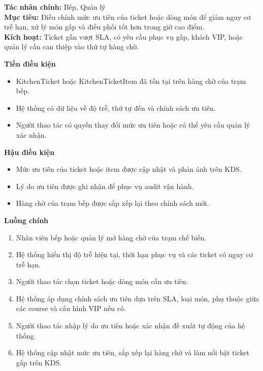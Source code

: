 \documentclass[11pt,a4paper]{article}
\begin{document}
    \begin{usecasebox}[title={UC-KIT-03 --- Ưu tiên hàng chờ bếp và xử lý món gấp}]
    \textbf{Tác nhân chính:} Bếp, Quản lý\\
    \textbf{Mục tiêu:} Điều chỉnh mức ưu tiên của ticket hoặc dòng món để giảm nguy cơ trễ hạn, xử lý món gấp và điều phối tốt hơn trong giờ cao điểm.\\
    \textbf{Kích hoạt:} Ticket gần vượt SLA, có yêu cầu phục vụ gấp, khách VIP, hoặc quản lý cần can thiệp vào thứ tự hàng chờ.

    \medskip
    \textbf{Tiền điều kiện}
    \begin{itemize}[leftmargin=1.8em]
  \item \textsf{KitchenTicket} hoặc \textsf{KitchenTicketItem} đã tồn tại trên hàng chờ của trạm bếp.
  \item Hệ thống có dữ liệu về độ trễ, thứ tự đến và chính sách ưu tiên.
  \item Người thao tác có quyền thay đổi mức ưu tiên hoặc có thể yêu cầu quản lý xác nhận.
\end{itemize}

    \textbf{Hậu điều kiện}
    \begin{itemize}[leftmargin=1.8em]
  \item Mức ưu tiên của ticket hoặc item được cập nhật và phản ánh trên KDS.
  \item Lý do ưu tiên được ghi nhận để phục vụ audit vận hành.
  \item Hàng chờ của trạm bếp được sắp xếp lại theo chính sách mới.
\end{itemize}

    \textbf{Luồng chính}
    \begin{enumerate}[leftmargin=1.8em]
  \item Nhân viên bếp hoặc quản lý mở hàng chờ của trạm chế biến.
  \item Hệ thống hiển thị độ trễ hiện tại, thời hạn phục vụ và các ticket có nguy cơ trễ hạn.
  \item Người thao tác chọn ticket hoặc dòng món cần ưu tiên.
  \item Hệ thống áp dụng chính sách ưu tiên dựa trên SLA, loại món, phụ thuộc giữa các course và cấu hình VIP nếu có.
  \item Người thao tác nhập lý do ưu tiên hoặc xác nhận đề xuất tự động của hệ thống.
  \item Hệ thống cập nhật mức ưu tiên, sắp xếp lại hàng chờ và làm nổi bật ticket gấp trên KDS.
\end{enumerate}


\end{usecasebox}
\end{document}
